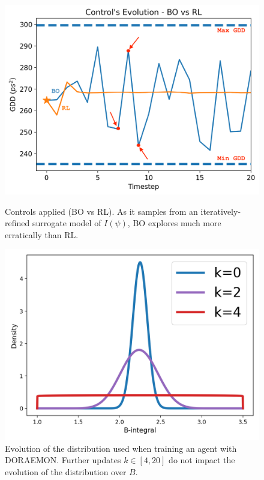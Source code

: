 \begin{figure}
        \centering
        \begin{minipage}{0.45\textwidth}
            \centering
            \includegraphics[width=\linewidth]{images/machinesafety.png}
            \caption{Controls applied (BO vs RL). As it samples from an iteratively-refined surrogate model of \(I(\psi)\), BO explores much more erratically than RL.}
            \label{fig:bayes_vs_rl}
        \end{minipage}
        \hfill
        \begin{minipage}{0.45\textwidth}
            \centering
            \includegraphics[width=\linewidth]{images/doraemon_distributions_3in1.png}
            \caption{Evolution of the distribution used when training an agent with DORAEMON. Further updates \( k \in [4,20] \) do not impact the evolution of the distribution over \( B \).}
            \label{fig:DORAEMON_distrs_over_training}
        \end{minipage}
        \label{fig:control_and_distribution}
\end{figure}

